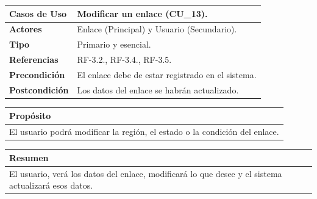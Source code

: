 \begin{itemize}
    \begin{table}[h!]
        \centering
        \begin{tabular}{|l|p{}|}
            \hline
            \textbf{Casos de Uso}   &   Modificar un enlace (CU\_13). \\
            \hline 
            \textbf{Actores}        &   Enlace (Principal) y Usuario (Secundario). \\ 
            \hline 
            \textbf{Tipo}           &   Primario y esencial. \\
            \hline
            \textbf{Referencias}    &   RF-3.2., RF-3.4., RF-3.5. \\ 
            \hline
            \textbf{Precondición}   &   El enlace debe de estar registrado en el sistema. \\ 
            \hline
            \textbf{Postcondición}  &   Los datos del enlace se habrán actualizado. \\ 
            \hline
        \end{tabular}
        
        \vspace{5mm}
        
        \begin{tabular}{|p{\textwidth}|}
            \hline
            \rowcolor{SeaGreen} \textbf{Propósito} \\
            \hline
            \multicolumn{1}{|p{12cm}|}{El usuario podrá modificar la región, el estado o la condición del enlace.} \\ [0.5ex]
            \hline
        \end{tabular}
        
        \vspace{5mm}
        
        \begin{tabular}{|p{\textwidth}|}
            \hline
            \rowcolor{SeaGreen} \textbf{Resumen} \\
            \hline
            \multicolumn{1}{|p{12cm}|}{El usuario, verá los datos del enlace, modificará lo que desee y el sistema 
            actualizará esos datos.} \\ [0.5ex]
            \hline
        \end{tabular}
        
        \vspace{5mm}
        

\end{table}
\end{itemize}
